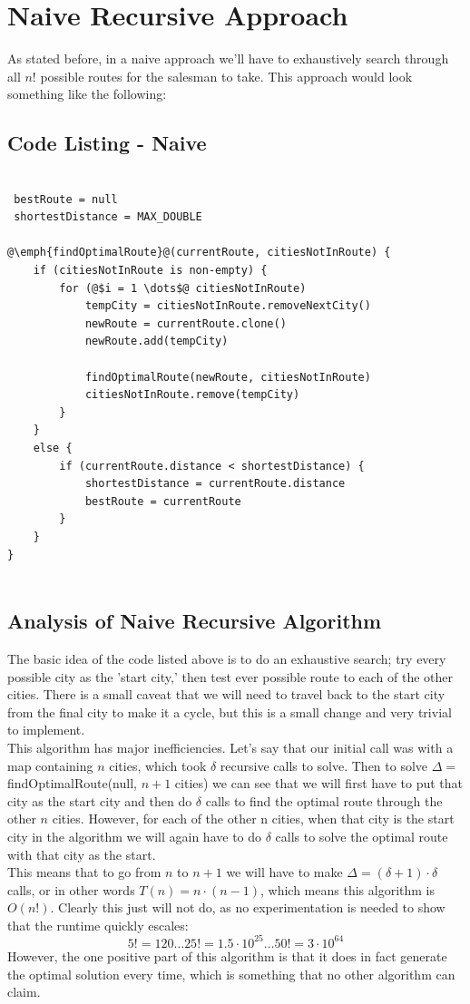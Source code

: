 \documentclass[paper=a4, fontsize=11pt]{scrartcl} %
\numberwithin{equation}{section} %
\numberwithin{figure}{section} %
\numberwithin{table}{section} %
\begin{document}
%
%
%
\section{Naive Recursive Approach}
As stated before, in a naive approach we'll have to exhaustively search through all $n!$ possible routes for the salesman to take. This approach would look something like the following:

\subsection{Code Listing - Naive}
\lstset{escapechar=\@}
\lstset{tabsize=2}
 \begin{lstlisting}
 
 bestRoute = null
 shortestDistance = MAX_DOUBLE
 
@\emph{findOptimalRoute}@(currentRoute, citiesNotInRoute) {
	if (citiesNotInRoute is non-empty) {
		for (@$i = 1 \dots$@ citiesNotInRoute)
			tempCity = citiesNotInRoute.removeNextCity()
			newRoute = currentRoute.clone()
			newRoute.add(tempCity)
			
			findOptimalRoute(newRoute, citiesNotInRoute)
			citiesNotInRoute.remove(tempCity)
		}
	}
	else {
		if (currentRoute.distance < shortestDistance) {
			shortestDistance = currentRoute.distance
			bestRoute = currentRoute
		}
	}
}
	
\end{lstlisting}   
\subsection{Analysis of Naive Recursive Algorithm}

The basic idea of the code listed above is to do an exhaustive search; try every possible city as the 'start city,' then test ever possible route to each of the other cities. There is a small caveat that we will need to travel back to the start city from the final city to make it a cycle, but this is a small change and very trivial to implement. \\
\indent This algorithm has major inefficiencies. Let's say that our initial call was with a map containing $n$ cities, which took $\delta$ recursive calls to solve. Then to solve $\Delta =$ findOptimalRoute(null, $n+1$ cities) we can see that we will first have to put that city as the start city and then do $\delta$ calls to find the optimal route through the other $n$ cities. However, for each of the other n cities, when that city is the start city in the algorithm we will again have to do $\delta$ calls to solve the optimal route with that city as the start.\\ 
\indent This means that to go from $n$ to $n+1$ we will have to make $\Delta = (\delta + 1)\cdot \delta$ calls, or in other words $T(n) = n\cdot(n-1)$, which means this algorithm is $O(n!)$. Clearly this just will not do, as no experimentation is needed to show that the runtime quickly escales: 
\[
5! = 120 \dots 25! = 1.5 \cdot 10^{25} \dots 50! = 3 \cdot 10^{64} 
\]
However, the one positive part of this algorithm is that it does in fact generate the optimal solution every time, which is something that no other algorithm can claim.
\end{document}

